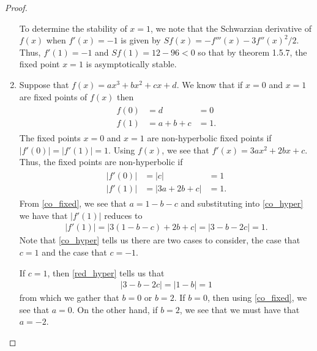 \begin{proof}
\begin{enumerate}
      To determine the stability of $x=1$, we note that the Schwarzian derivative of $f(x)$
      when $f'(x) = -1$ is given by $Sf(x) = -f'''(x) - 3f''(x)^2/2$. Thus, $f'(1) = -1$ and
      $Sf(1) = 12 - 96 < 0$ so that by
      theorem 1.5.7, the fixed point $x=1$ is asymptotically stable.
    \item Suppose that $f(x) = ax^3 + bx^2 + cx + d$. We know that if $x=0$ and $x=1$ are fixed points
      of $f(x)$ then
      \begin{align}\label{co_fixed}
        \begin{array}{lll}
          f(0) &= d &= 0 \\
          f(1) &= a + b + c &= 1.
        \end{array}
      \end{align}
      The fixed points $x=0$ and $x=1$ are non-hyperbolic fixed points if $|f'(0)| = |f'(1)| = 1$.
      Using $f(x)$, we see that $f'(x) = 3ax^2 + 2bx + c$. Thus, the fixed points are non-hyperbolic
      if
      \begin{align}\label{co_hyper}
        \begin{array}{lll}
          \left|f'(0)\right| &= |c| &= 1 \\
          \left|f'(1)\right| &= |3a + 2b + c| &= 1.
        \end{array}
      \end{align}
      From \eqref{co_fixed}, we see that $a = 1 -b -c$ and substituting into \eqref{co_hyper} we have that $|f'(1)|$ reduces to
      \begin{align}\label{red_hyper}
        \left|f'(1)\right| = |3(1 - b - c) + 2b + c| = |3 -b - 2c| = 1.
      \end{align}
      Note that \eqref{co_hyper} tells us there are two cases to consider, the case that
      $c = 1$ and the case that $c=-1$.

      If $c=1$, then \eqref{red_hyper} tells us that
      \begin{align*}
        |3-b-2c| = |1 -b| = 1
      \end{align*}
      from which we gather that $b=0$ or $b=2$. If $b=0$, then using \eqref{co_fixed}, we see that $a=0$. On the other hand, if
      $b=2$, we see that we must have that $a=-2$.


\end{enumerate}
\end{proof}
